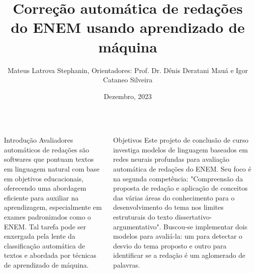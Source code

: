 \documentclass[
  xcolor={hyperref,svgnames,x11names,table},
  hyperref={pdfencoding=unicode,plainpages=false,pdfpagelabels=true,breaklinks=true},
  brazilian, english
]{beamer}
\title{Correção automática de redações do ENEM usando aprendizado de máquina}
\author[mateuslatrova@usp.br, ddm@ime.usp.br, igorcs@ime.usp.br]{Mateus Latrova Stephanin, Orientadores: Prof. Dr. Dênis Deratani Mauá e Igor Cataneo Silveira}
\institute{Instituto de Matemática e Estatística --- Universidade de São Paulo}
\date{Dezembro, 2023}
\newcommand\halfcol{\column{.48\textwidth}}
\begin{document}

\begin{frame}[fragile]\centering


\begin{columns}[T]

  \halfcol

  \begin{block}{Introdução}
  \justifying
        Avaliadores automáticos de redações são softwares que pontuam textos em linguagem natural com base em objetivos educacionais, oferecendo uma abordagem eficiente para auxiliar na aprendizagem, especialmente em exames padronizados como o ENEM. Tal tarefa pode ser enxergada pela lente da classificação automática de textos e abordada por técnicas de aprendizado de máquina.
  \end{block}

  \begin{block}{Objetivos}
  \justifying
       Este projeto de conclusão de curso investiga modelos de linguagem baseados em redes neurais profundas para avaliação automática de redações do ENEM. Seu foco é na segunda competência: "Compreensão da proposta de redação e aplicação de conceitos das várias áreas do conhecimento para o desenvolvimento do tema nos limites estruturais do texto dissertativo-argumentativo". Buscou-se implementar dois modelos para avaliá-la: um para detectar o desvio do tema proposto e outro para identificar se a redação é um aglomerado de palavras.\nocite{mec_correcao}
  \end{block}

  



\end{columns}
\end{frame}
\end{document}
